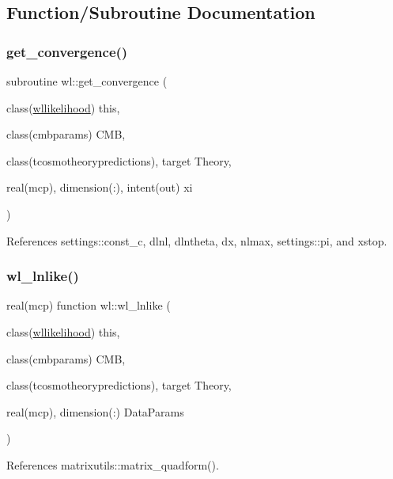 \subsection{Function/\+Subroutine Documentation}
\mbox{\label{namespacewl_a1238699402e6cd69190706ee7bf42356}} 
\subsubsection{\texorpdfstring{get\+\_\+convergence()}{get\_convergence()}}
{\footnotesize\ttfamily subroutine wl\+::get\+\_\+convergence (\begin{DoxyParamCaption}\item[{class(\mbox{\hyperlink{structwl_1_1wllikelihood}{wllikelihood}})}]{this,  }\item[{class(cmbparams)}]{C\+MB,  }\item[{class(tcosmotheorypredictions), target}]{Theory,  }\item[{real(mcp), dimension(\+:), intent(out)}]{xi }\end{DoxyParamCaption})}



References settings\+::const\+\_\+c, dlnl, dlntheta, dx, nlmax, settings\+::pi, and xstop.

\mbox{\label{namespacewl_ae6b71112cf916069d3fc83f99af9168c}} 
\subsubsection{\texorpdfstring{wl\+\_\+lnlike()}{wl\_lnlike()}}
{\footnotesize\ttfamily real(mcp) function wl\+::wl\+\_\+lnlike (\begin{DoxyParamCaption}\item[{class(\mbox{\hyperlink{structwl_1_1wllikelihood}{wllikelihood}})}]{this,  }\item[{class(cmbparams)}]{C\+MB,  }\item[{class(tcosmotheorypredictions), target}]{Theory,  }\item[{real(mcp), dimension(\+:)}]{Data\+Params }\end{DoxyParamCaption})}



References matrixutils\+::matrix\+\_\+quadform().

